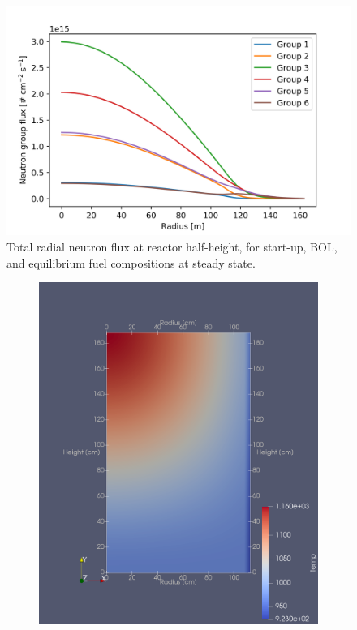 \documentclass{anstrans}
\begin{document}
{\begin{figure}[H] 
	\centering
	\includegraphics[width=.48\textwidth]{./figures/stflux}
	\captionsetup{justification=centering}
	\caption{Total radial neutron flux at reactor half-height, for start-up,
	\gls{BOL}, and equilibrium fuel compositions at steady state.}
	\label{fig:stflux}
\end{figure} 

\begin{figure}%
\centering
\begin{subfigure}{1\columnwidth}
\includegraphics[width=\columnwidth]{./figures/sttemp}%
\end{subfigure}\hfill%
\begin{subfigure}{1\columnwidth}

\end{subfigure}
\end{figure}}
\end{document}
